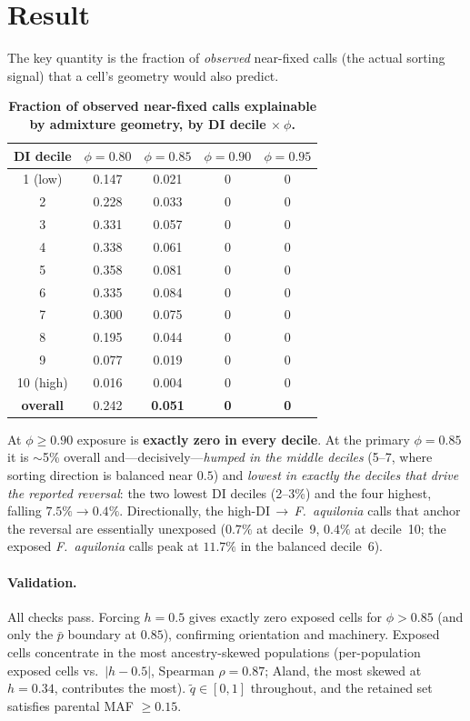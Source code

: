 \documentclass[11pt]{article}
\newcommand{\Faq}{\textit{F.~aquilonia}}
\begin{document}
\section*{Result}

The key quantity is the fraction of \emph{observed} near-fixed calls (the actual sorting signal)
that a cell's geometry would also predict.

\begin{table}[h]
\centering
\caption*{\textbf{Fraction of observed near-fixed calls explainable by admixture geometry, by DI
decile $\times\ \phi$.}}
\begin{tabular}{ccccc}
\toprule
DI decile & $\phi=0.80$ & $\phi=0.85$ & $\phi=0.90$ & $\phi=0.95$ \\
\midrule
1 (low)  & 0.147 & 0.021 & 0 & 0 \\
2        & 0.228 & 0.033 & 0 & 0 \\
3        & 0.331 & 0.057 & 0 & 0 \\
4        & 0.338 & 0.061 & 0 & 0 \\
5        & 0.358 & 0.081 & 0 & 0 \\
6        & 0.335 & 0.084 & 0 & 0 \\
7        & 0.300 & 0.075 & 0 & 0 \\
8        & 0.195 & 0.044 & 0 & 0 \\
9        & 0.077 & 0.019 & 0 & 0 \\
10 (high)& 0.016 & 0.004 & 0 & 0 \\
\midrule
\textbf{overall} & 0.242 & \textbf{0.051} & \textbf{0} & \textbf{0} \\
\bottomrule
\end{tabular}
\end{table}

At $\phi\ge0.90$ exposure is \textbf{exactly zero in every decile}. At the primary
$\phi=0.85$ it is $\sim$5\% overall and---decisively---\emph{humped in the middle deciles}
(5--7, where sorting direction is balanced near $0.5$) and \emph{lowest in exactly the deciles
that drive the reported reversal}: the two lowest DI deciles (2--3\%) and the four highest,
falling $7.5\%\!\to\!0.4\%$. Directionally, the high-DI\,$\to$\,\Faq{} calls that anchor the
reversal are essentially unexposed ($0.7\%$ at decile~9, $0.4\%$ at decile~10; the exposed
\Faq{} calls peak at $11.7\%$ in the balanced decile~6).

\paragraph{Validation.} All checks pass. Forcing $h=0.5$ gives exactly zero exposed cells for
$\phi>0.85$ (and only the $\bar p$ boundary at $0.85$), confirming orientation and machinery.
Exposed cells concentrate in the most ancestry-skewed populations (per-population exposed cells
vs.\ $|h-0.5|$, Spearman $\rho=0.87$; Aland, the most skewed at $h=0.34$, contributes the most).
$\tilde q\in[0,1]$ throughout, and the retained set satisfies parental MAF $\ge0.15$.
\end{document}
